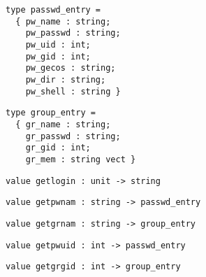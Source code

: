 \begin{verbatim}
type passwd_entry =
  { pw_name : string;
    pw_passwd : string;
    pw_uid : int;
    pw_gid : int;
    pw_gecos : string;
    pw_dir : string;
    pw_shell : string }
\end{verbatim}
\begin{comment}
 Structure of entries in the \verbpasswd database. 
\end{comment}
\begin{verbatim}
type group_entry =
  { gr_name : string;
    gr_passwd : string;
    gr_gid : int;
    gr_mem : string vect }
\end{verbatim}
\begin{comment}
 Structure of entries in the \verbgroups database. 
\end{comment}
\begin{verbatim}
value getlogin : unit -> string
\end{verbatim}
%
\begin{comment}
 Return the login name of the user executing the process. 
\end{comment}
\begin{verbatim}
value getpwnam : string -> passwd_entry
\end{verbatim}
%
\begin{comment}
 Find an entry in \verbpasswd with the given name, or raise
           \verbNot_found. 
\end{comment}
\begin{verbatim}
value getgrnam : string -> group_entry
\end{verbatim}
%
\begin{comment}
 Find an entry in \verbgroup with the given name, or raise
           \verbNot_found. 
\end{comment}
\begin{verbatim}
value getpwuid : int -> passwd_entry
\end{verbatim}
%
\begin{comment}
 Find an entry in \verbpasswd with the given user id, or raise
           \verbNot_found. 
\end{comment}
\begin{verbatim}
value getgrgid : int -> group_entry
\end{verbatim}
%
\begin{comment}
 Find an entry in \verbgroup with the given group id, or raise
           \verbNot_found. 
\end{comment}
